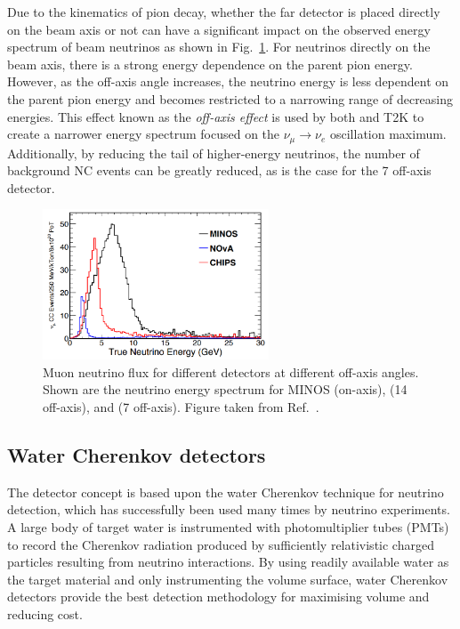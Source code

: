 Due to the kinematics of pion decay, whether the far detector is placed directly on the beam axis
or not can have a significant impact on the observed energy spectrum of beam neutrinos as shown in
Fig.~\ref{fig:numi_axis}. For neutrinos directly on the beam axis, there is a strong energy
dependence on the parent pion energy. However, as the off-axis angle increases, the neutrino
energy is less dependent on the parent pion energy and becomes restricted to a narrowing range of
decreasing energies. This effect known as the \emph{off-axis effect} is used by both \nova and T2K
to create a narrower energy spectrum focused on the $\nu_{\mu}\rightarrow\nu_{e}$ oscillation
maximum. Additionally, by reducing the tail of higher-energy neutrinos, the number of background
NC events can be greatly reduced, as is the case for the \unit{7}{} off-axis
\chipsfive detector.

\begin{figure} %
    \includegraphics[width=0.6\textwidth]{diagrams/4-chips/numi_axis.png}
    \caption[Muon neutrino flux for different \numi detectors at different off-axis angles.]
    {Muon neutrino flux for different \numi detectors at different off-axis angles. Shown are the
        neutrino energy spectrum for MINOS (on-axis), \nova (\unit{14}{} off-axis),
        and \chipsfive (\unit{7}{} off-axis). Figure taken from
        Ref.~\cite{adamson2013}.}
    \label{fig:numi_axis}
\end{figure}

\subsection{Water Cherenkov detectors} %
\label{sec:chips_concept_cherenkov} %

The \chips detector concept is based upon the water Cherenkov technique for neutrino detection,
which has successfully been used many times by neutrino experiments. A large body of target water
is instrumented with photomultiplier tubes (PMTs) to record the Cherenkov radiation produced by
sufficiently relativistic charged particles resulting from neutrino interactions. By using readily
available water as the target material and only instrumenting the volume surface, water Cherenkov
detectors provide the best detection methodology for maximising volume and reducing cost.

